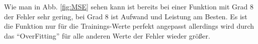 Wie man in Abb. \ref{fig:MSE} sehen kann ist bereits bei einer Funktion mit Grad 8 der Fehler sehr gering, bei Grad 8 ist  
Aufwand und Leistung am Besten. Es ist die Funktion nur für die Trainings-Werte 
perfekt angepasst allerdings wird durch das ``OverFitting'' für alle anderen Werte der Fehler wieder größer.
